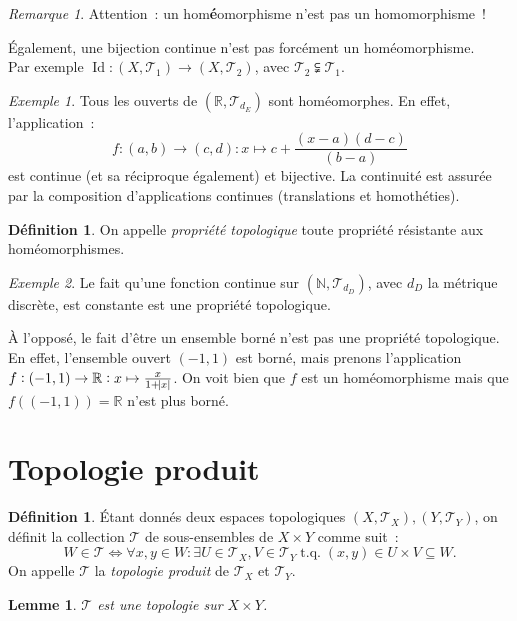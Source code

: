 \documentclass{report}
\newtheorem{lem}[thm]{Lemme}
\theoremstyle{definition}
\newtheorem{déf}[thm]{Définition}
\theoremstyle{remark}
\newtheorem*{rmq}{Remarque}
\newtheorem{ex}{Exemple}[chapter]
\DeclareMathOperator{\tq}{\text{ t.q. }}
\DeclareMathOperator{\Id}{Id}
\newcommand{\R}{\mathbb R}
\newcommand{\N}{\mathbb N}
\renewcommand{\top}{\mathcal T}
\begin{document}
		\begin{rmq} Attention~: un hom\textbf{é}omorphisme n'est pas un homomorphisme~!

		Également, une bijection continue n'est pas forcément un homéomorphisme.\\
		Par exemple $\Id : (X, \top_1) \to (X, \top_2)$, avec $\top_2 \subsetneqq \top_1$.
		\end{rmq}

		\begin{ex} Tous les ouverts de $(\R, \top_{d_E})$ sont homéomorphes. En effet, l'application~:
		\[f : (a, b) \to (c, d) : x \mapsto c + \frac {(x-a)(d-c)}{(b-a)}\]
		est continue (et sa réciproque également) et bijective. La continuité est assurée par la composition d'applications continues (translations et
		homothéties).
		\end{ex}

		\begin{déf} On appelle \textit{propriété topologique} toute propriété résistante aux homéomorphismes.
		\end{déf}

		\begin{ex} Le fait qu'une fonction continue sur $(\N, \top_{d_D})$, avec $d_D$ la métrique discrète, est constante est une propriété topologique.

		À l'opposé, le fait d'être un ensemble borné n'est pas une propriété topologique. En effet, l'ensemble ouvert $(-1, 1)$ est borné, mais prenons
		l'application $f : (-1, 1) \to \R : x \mapsto \frac x{1 + \abs x}$. On voit bien que $f$ est un homéomorphisme mais que $f((-1, 1)) = \R$ n'est plus borné.
		\end{ex}

	\section{Topologie produit}
		\begin{déf} Étant donnés deux espaces topologiques $(X, \top_X), (Y, \top_Y)$, on définit la collection $\top$ de sous-ensembles de $X \times Y$ comme
		suit~:
		\[W \in \top \iff \forall x, y \in W : \exists U \in \top_X, V \in \top_Y \tq (x, y) \in U \times V \subseteq W.\]
		On appelle $\top$ la \textit{topologie produit} de $\top_X$ et $\top_Y$.
		\end{déf}

		\begin{lem} $\top$ est une topologie sur $X \times Y$.
		\end{lem}
\end{document}
